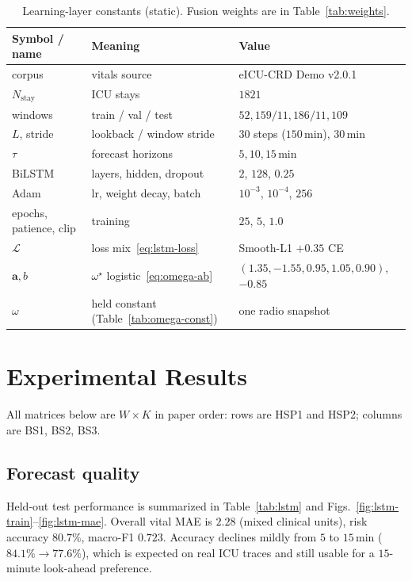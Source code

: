 \documentclass[journal,a4paper,10pt]{IEEEtran}
\begin{document}
\begin{table}[!t]
\caption{Learning-layer constants (static). Fusion weights are in Table~\ref{tab:weights}.}
\label{tab:learn}
\centering
\begin{tabular}{@{}lll@{}}
\toprule
Symbol / name & Meaning & Value \\
\midrule
corpus & vitals source & eICU-CRD Demo v2.0.1 \\
\(N_{\mathrm{stay}}\) & ICU stays & \(1821\) \\
windows & train / val / test & \(52{,}159/11{,}186/11{,}109\) \\
\(L\), stride & lookback / window stride & \(30\) steps (\(150\)\,min), \(30\)\,min \\
\(\tau\) & forecast horizons & \(5,10,15\)\,min \\
BiLSTM & layers, hidden, dropout & \(2\), \(128\), \(0.25\) \\
Adam & lr, weight decay, batch & \(10^{-3}\), \(10^{-4}\), \(256\) \\
epochs, patience, clip & training & \(25\), \(5\), \(1.0\) \\
\(\mathcal{L}\) & loss mix~\eqref{eq:lstm-loss} & Smooth-L1 \(+0.35\) CE \\
\(\mathbf{a},b\) & \(\omega^\star\) logistic~\eqref{eq:omega-ab} & \((1.35,-1.55,0.95,1.05,0.90)\), \(-0.85\) \\
\(\omega\) & held constant (Table~\ref{tab:omega-const}) & one radio snapshot \\
\bottomrule
\end{tabular}
\end{table}

\section{Experimental Results}
\label{sec:results}

All matrices below are \(W\times K\) in paper order: rows are HSP1 and HSP2; columns are BS1, BS2, BS3.

\subsection{Forecast quality}
Held-out test performance is summarized in Table~\ref{tab:lstm} and Figs.~\ref{fig:lstm-train}--\ref{fig:lstm-mae}. Overall vital MAE is \(2.28\) (mixed clinical units), risk accuracy \(80.7\%\), macro-F1 \(0.723\). Accuracy declines mildly from \(5\) to \(15\)\,min (\(84.1\%\to 77.6\%\)), which is expected on real ICU traces and still usable for a \(15\)-minute look-ahead preference.
\end{document}
